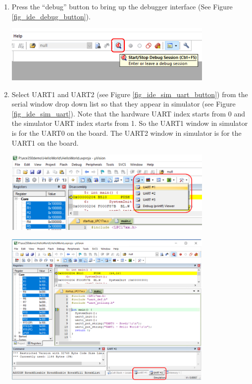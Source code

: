\begin{enumerate}
      \item Press the ``debug'' button to bring up the debugger interface (See Figure \ref{fig_ide_debug_button}). \par
        \begin{minipage}{\linewidth}
          \centering
          \includegraphics[width=4in]{figure/uv5/IDE_debug_button}
          \label{fig_ide_debug_button}
        \end{minipage}

      \item Select UART1 and UART2 (see Figure \ref{fig_ide_sim_uart_button}) from the serial window drop down list so that they appear in simulator (see Figure \ref{fig_ide_sim_uart}). Note that the hardware UART index starts from 0 and the simulator UART index starts from 1. So the UART1 window in simulator is for the UART0 on the board. The UART2 window in simulator is for the UART1 on the board. \par 

        \begin{minipage}{\linewidth}
          \centering
          \includegraphics[width=4in]{figure/uv5/IDE_sim_uart_button}
          \label{fig_ide_sim_uart_button}
        \end{minipage}
        \par
        \begin{minipage}{\linewidth}
          \centering
          \includegraphics[width=4in]{figure/uv5/IDE_sim_uart}
          \label{fig_ide_sim_uart}
        \end{minipage}


\end{enumerate}
